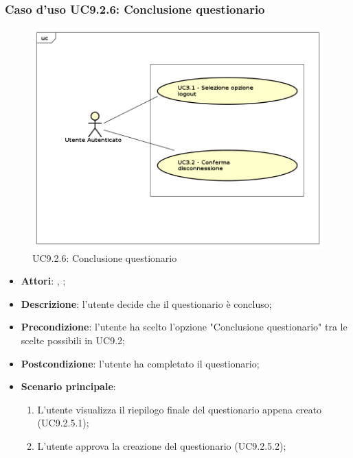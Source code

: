 		\subsubsection{Caso d'uso UC9.2.6: Conclusione questionario}
		\label{UC9.2.6}
		\begin{figure}[h]
			\centering
			\includegraphics[scale=0.5,keepaspectratio]{UML/UC9.png}
			\caption{UC9.2.6: Conclusione questionario}
		\end{figure}
		\FloatBarrier
		\begin{itemize}
			\item \textbf{Attori}: \uau, \uaupro; 
			\item \textbf{Descrizione}: l'utente decide che il questionario è concluso;
			\item \textbf{Precondizione}: l'utente ha scelto l'opzione "Conclusione questionario" tra le scelte possibili in UC9.2;
			\item \textbf{Postcondizione}: l'utente ha completato il questionario;
			\item \textbf{Scenario principale}: 
				\begin{enumerate}
					\item L'utente visualizza il riepilogo finale del questionario appena creato (UC9.2.5.1); 
					\item L'utente approva la creazione del questionario (UC9.2.5.2); 
				\end{enumerate}
		\end{itemize}
				
